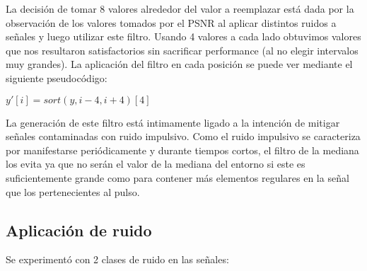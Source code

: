 La decisi\'on de tomar 8 valores alrededor del valor a reemplazar est\'a dada por la observaci\'on
de los valores tomados por el PSNR al aplicar distintos ruidos a se\~nales y luego utilizar este 
filtro. Usando 4 valores a cada lado obtuvimos valores que nos resultaron satisfactorios sin 
sacrificar performance (al no elegir intervalos muy grandes). La aplicaci\'on del filtro en cada
posici\'on se puede ver mediante el siguiente pseudoc\'odigo:

\begin{center}
$y'[i]= sort(y, i - 4, i + 4)[4]$\\
\end{center}

La generaci\'on de este filtro est\'a intimamente ligado a la intenci\'on de mitigar se\~nales contaminadas
con ruido impulsivo. Como el ruido impulsivo se caracteriza por manifestarse peri\'odicamente y durante tiempos
cortos, el filtro de la mediana los evita ya que no ser\'an el valor de la mediana del entorno si este es suficientemente
grande como para contener m\'as elementos regulares en la se\~nal que los pertenecientes al pulso.

\subsection{Aplicaci\'on de ruido}

Se experiment\'o con 2 clases de ruido en las se\~nales:

